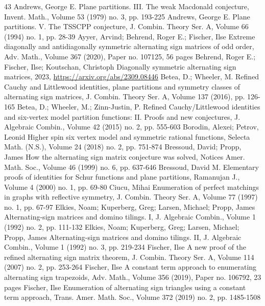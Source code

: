 \begin{thebibliography}{43}
 Andrews, George E. Plane partitions. III. The weak Macdonald conjecture, Invent. Math., Volume 53 (1979) no. 3, pp. 193-225
 Andrews, George E. Plane partitions. V. The TSSCPP conjecture, J. Combin. Theory Ser. A, Volume 66 (1994) no. 1, pp. 28-39
 Ayyer, Arvind; Behrend, Roger E.; Fischer, Ilse Extreme diagonally and antidiagonally symmetric alternating sign matrices of odd order, Adv. Math., Volume 367 (2020), Paper no. 107125, 56 pages
 Behrend, Roger E.; Fischer, Ilse; Koutschan, Christoph Diagonally symmetric alternating sign matrices, 2023, \url{https://arxiv.org/abs/2309.08446}
 Betea, D.; Wheeler, M. Refined Cauchy and Littlewood identities, plane partitions and symmetry classes of alternating sign matrices, J. Combin. Theory Ser. A, Volume 137 (2016), pp. 126-165
 Betea, D.; Wheeler, M.; Zinn-Justin, P. Refined Cauchy/Littlewood identities and six-vertex model partition functions: II. Proofs and new conjectures, J. Algebraic Combin., Volume 42 (2015) no. 2, pp. 555-603
 Borodin, Alexei; Petrov, Leonid Higher spin six vertex model and symmetric rational functions, Selecta Math. (N.S.), Volume 24 (2018) no. 2, pp. 751-874
 Bressoud, David; Propp, James How the alternating sign matrix conjecture was solved, Notices Amer. Math. Soc., Volume 46 (1999) no. 6, pp. 637-646
 Bressoud, David M. Elementary proofs of identities for Schur functions and plane partitions, Ramanujan J., Volume 4 (2000) no. 1, pp. 69-80
 Ciucu, Mihai Enumeration of perfect matchings in graphs with reflective symmetry, J. Combin. Theory Ser. A, Volume 77 (1997) no. 1, pp. 67-97
 Elkies, Noam; Kuperberg, Greg; Larsen, Michael; Propp, James Alternating-sign matrices and domino tilings. I, J. Algebraic Combin., Volume 1 (1992) no. 2, pp. 111-132
 Elkies, Noam; Kuperberg, Greg; Larsen, Michael; Propp, James Alternating-sign matrices and domino tilings. II, J. Algebraic Combin., Volume 1 (1992) no. 3, pp. 219-234
 Fischer, Ilse A new proof of the refined alternating sign matrix theorem, J. Combin. Theory Ser. A, Volume 114 (2007) no. 2, pp. 253-264
 Fischer, Ilse A constant term approach to enumerating alternating sign trapezoids, Adv. Math., Volume 356 (2019), Paper no. 106792, 23 pages
 Fischer, Ilse Enumeration of alternating sign triangles using a constant term approach, Trans. Amer. Math. Soc., Volume 372 (2019) no. 2, pp. 1485-1508

\end{thebibliography}
